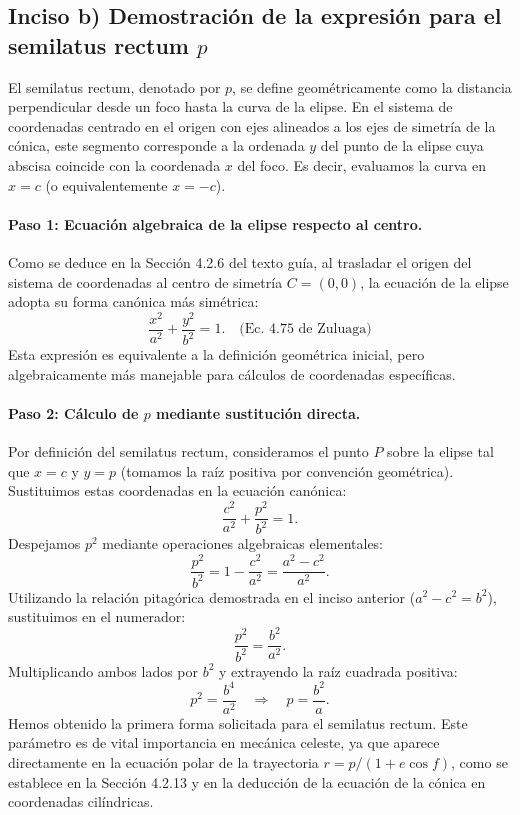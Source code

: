 \documentclass[12pt, a4paper]{article}
\begin{document}
\subsection*{Inciso b) Demostración de la expresión para el semilatus rectum $p$}

El semilatus rectum, denotado por $p$, se define geométricamente como la distancia perpendicular desde un foco hasta la curva de la elipse. En el sistema de coordenadas centrado en el origen con ejes alineados a los ejes de simetría de la cónica, este segmento corresponde a la ordenada $y$ del punto de la elipse cuya abscisa coincide con la coordenada $x$ del foco. Es decir, evaluamos la curva en $x = c$ (o equivalentemente $x = -c$).

\paragraph{Paso 1: Ecuación algebraica de la elipse respecto al centro.}
Como se deduce en la Sección 4.2.6 del texto guía, al trasladar el origen del sistema de coordenadas al centro de simetría $C = (0,0)$, la ecuación de la elipse adopta su forma canónica más simétrica:
$$
\frac{x^2}{a^2} + \frac{y^2}{b^2} = 1. \quad \text{(Ec. 4.75 de Zuluaga)}
$$
Esta expresión es equivalente a la definición geométrica inicial, pero algebraicamente más manejable para cálculos de coordenadas específicas.

\paragraph{Paso 2: Cálculo de $p$ mediante sustitución directa.}
Por definición del semilatus rectum, consideramos el punto $P$ sobre la elipse tal que $x = c$ y $y = p$ (tomamos la raíz positiva por convención geométrica). Sustituimos estas coordenadas en la ecuación canónica:
$$
\frac{c^2}{a^2} + \frac{p^2}{b^2} = 1.
$$
Despejamos $p^2$ mediante operaciones algebraicas elementales:
$$
\frac{p^2}{b^2} = 1 - \frac{c^2}{a^2} = \frac{a^2 - c^2}{a^2}.
$$
Utilizando la relación pitagórica demostrada en el inciso anterior ($a^2 - c^2 = b^2$), sustituimos en el numerador:
$$
\frac{p^2}{b^2} = \frac{b^2}{a^2}.
$$
Multiplicando ambos lados por $b^2$ y extrayendo la raíz cuadrada positiva:
$$
p^2 = \frac{b^4}{a^2} \quad \Longrightarrow \quad p = \frac{b^2}{a}.
$$
Hemos obtenido la primera forma solicitada para el semilatus rectum. Este parámetro es de vital importancia en mecánica celeste, ya que aparece directamente en la ecuación polar de la trayectoria $r = p / (1 + e \cos f)$, como se establece en la Sección 4.2.13 y en la deducción de la ecuación de la cónica en coordenadas cilíndricas.
\end{document}
